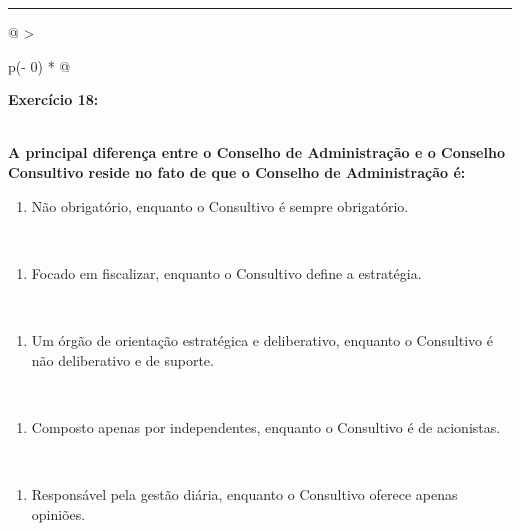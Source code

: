 \documentclass[
]{book}
\providecommand{\tightlist}{%
  \setlength{\itemsep}{0pt}\setlength{\parskip}{0pt}}
\begin{document}
\begin{center}\rule{0.5\linewidth}{0.5pt}\end{center}

\begin{longtable}[]{@{}
  >{\raggedright\arraybackslash}p{(\columnwidth - 0\tabcolsep) * }@{}}
\toprule\noalign{}
\begin{minipage}[b]{\linewidth}\raggedright
\textbf{Exercício 18:}
\end{minipage} \\
\midrule\noalign{}
\endhead
\bottomrule\noalign{}
\endlastfoot
\textbf{A principal diferença entre o Conselho de Administração e o Conselho Consultivo reside no fato de que o Conselho de Administração é:} \\
\begin{minipage}[t]{\linewidth}\raggedright
\begin{enumerate}
\def\labelenumi{\alph{enumi})}
\tightlist
\item
  Não obrigatório, enquanto o Consultivo é sempre obrigatório.
\end{enumerate}
\end{minipage} \\
\begin{minipage}[t]{\linewidth}\raggedright
\begin{enumerate}
\def\labelenumi{\alph{enumi})}
\setcounter{enumi}{1}
\tightlist
\item
  Focado em fiscalizar, enquanto o Consultivo define a estratégia.
\end{enumerate}
\end{minipage} \\
\begin{minipage}[t]{\linewidth}\raggedright
\begin{enumerate}
\def\labelenumi{\alph{enumi})}
\setcounter{enumi}{2}
\tightlist
\item
  Um órgão de orientação estratégica e deliberativo, enquanto o Consultivo é não deliberativo e de suporte.
\end{enumerate}
\end{minipage} \\
\begin{minipage}[t]{\linewidth}\raggedright
\begin{enumerate}
\def\labelenumi{\alph{enumi})}
\setcounter{enumi}{3}
\tightlist
\item
  Composto apenas por independentes, enquanto o Consultivo é de acionistas.
\end{enumerate}
\end{minipage} \\
\begin{minipage}[t]{\linewidth}\raggedright
\begin{enumerate}
\def\labelenumi{\alph{enumi})}
\setcounter{enumi}{4}
\tightlist
\item
  Responsável pela gestão diária, enquanto o Consultivo oferece apenas opiniões.
\end{enumerate}
\end{minipage} \\
\end{longtable}
\end{document}
